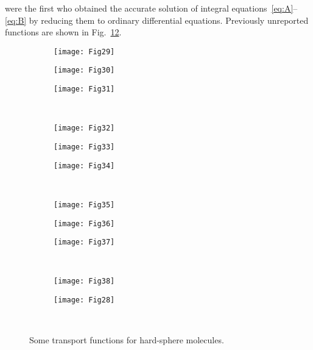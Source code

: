 \documentclass[]{elsarticle} %
\begin{document}
\citet{Pekeris1957} were the first who obtained the accurate solution of integral equations~\eqref{eq:A}--\eqref{eq:B}
by reducing them to ordinary differential equations.
Previously unreported functions are shown in Fig.~\ref{fig:transport_functions}.

\begin{figure}
    \centering
    \begin{subfigure}[b]{0.33\textwidth}
        \texttt{[image: Fig29]}
        \label{fig:T1_1}
    \end{subfigure}%
    \begin{subfigure}[b]{0.33\textwidth}
        \texttt{[image: Fig30]}
        \label{fig:T1_2}
    \end{subfigure}%
    \begin{subfigure}[b]{0.33\textwidth}
        \texttt{[image: Fig31]}
        \label{fig:T2_1}
    \end{subfigure}\\[-6pt]
    \begin{subfigure}[b]{0.33\textwidth}
        \texttt{[image: Fig32]}
        \label{fig:T2_2}
    \end{subfigure}%
    \begin{subfigure}[b]{0.33\textwidth}
        \texttt{[image: Fig33]}
        \label{fig:TT12}
    \end{subfigure}%
    \begin{subfigure}[b]{0.33\textwidth}
        \texttt{[image: Fig34]}
        \label{fig:TT2}
    \end{subfigure}\\[-6pt]
    \begin{subfigure}[b]{0.33\textwidth}
        \texttt{[image: Fig35]}
        \label{fig:Q2}
    \end{subfigure}%
    \begin{subfigure}[b]{0.33\textwidth}
        \texttt{[image: Fig36]}
        \label{fig:Q3}
    \end{subfigure}%
    \begin{subfigure}[b]{0.33\textwidth}
        \texttt{[image: Fig37]}
        \label{fig:QQ22}
    \end{subfigure}\\[-6pt]
    \begin{subfigure}[b]{0.33\textwidth}
        \texttt{[image: Fig38]}
        \label{fig:QQ3}
    \end{subfigure}%
    \begin{subfigure}[b]{0.33\textwidth}
        \texttt{[image: Fig28]}
        \label{fig:B_4}
    \end{subfigure}\\[-6pt]
    \caption{Some transport functions for hard-sphere molecules.}
    \label{fig:transport_functions}
\end{figure}



\end{document}
